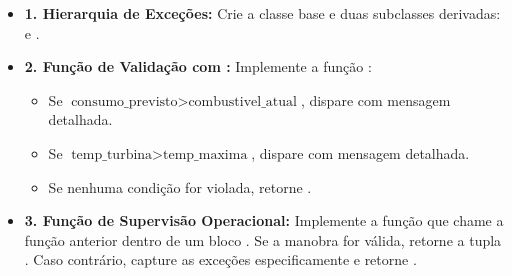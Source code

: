 \begin{enumerate}[label=\textbf{Q\arabic*.}]
\begin{itemize}[leftmargin=*]
    \item \textbf{1. Hierarquia de Exceções:}\newline
    Crie a classe base  e duas subclasses derivadas:  e .
    \item \textbf{2. Função de Validação com :}\newline
    Implemente a função :
    \begin{itemize}
        \item Se $\text{consumo\_previsto} > \text{combustivel\_atual}$, dispare  com mensagem detalhada.
        \item Se $\text{temp\_turbina} > \text{temp\_maxima}$, dispare  com mensagem detalhada.
        \item Se nenhuma condição for violada, retorne .
    \end{itemize}
    \item \textbf{3. Função de Supervisão Operacional:}\newline
    Implemente a função  que chame a função anterior dentro de um bloco . Se a manobra for válida, retorne a tupla . Caso contrário, capture as exceções especificamente e retorne .
\end{itemize}


\end{enumerate}
